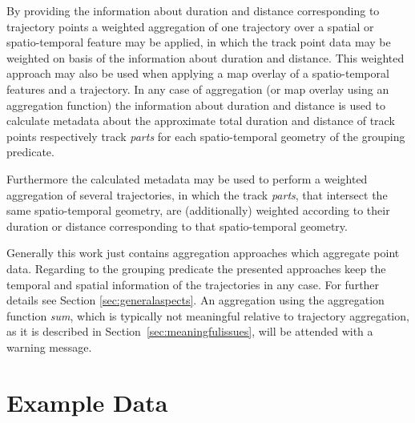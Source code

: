 \documentclass[12pt, oneside, a4paper]{scrbook}
\begin{document}
By providing the information about duration and distance corresponding to trajectory points a weighted aggregation of one trajectory over a spatial or spatio-temporal feature may be applied, in which the track point data may be weighted on basis of the information about duration and distance. This weighted approach may also be used when applying a map overlay of a spatio-temporal features and a trajectory. In any case of aggregation (or map overlay using an aggregation function) the information about duration and distance is used to calculate metadata about the approximate total duration and distance of track points respectively track \textit{parts} for each spatio-temporal geometry of the grouping predicate.
\par\medskip

Furthermore the calculated metadata may be used to perform a weighted aggregation of several trajectories, in which the track \textit {parts}, that intersect the same spatio-temporal geometry, are (additionally) weighted according to their duration or distance corresponding to that spatio-temporal geometry.
\par\medskip

Generally this work just contains aggregation approaches which aggregate point data. Regarding to the grouping predicate the presented approaches keep the temporal and spatial information of the trajectories in any case. For further details see Section \ref{sec:generalaspects}.
An aggregation using the aggregation function \textit{sum}, which is typically not meaningful relative to trajectory aggregation, as it is described in Section~\ref{sec:meaningfulissues}, will be attended with a warning message.






%
%
\chapter{Example Data}
\label{chap:exampledata}
\end{document}
